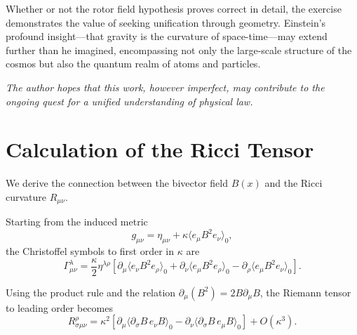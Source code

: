 \documentclass[11pt,a4paper]{article}
\numberwithin{equation}{section}
\theoremstyle{plain}
\theoremstyle{definition}
\theoremstyle{remark}
\newif\ifack
\begin{document}
Whether or not the rotor field hypothesis proves correct in detail, the exercise demonstrates the value of seeking unification through geometry. Einstein's profound insight---that gravity is the curvature of space-time---may extend further than he imagined, encompassing not only the large-scale structure of the cosmos but also the quantum realm of atoms and particles.

\medskip
\noindent\textit{The author hopes that this work, however imperfect, may contribute to the ongoing quest for a unified understanding of physical law.}

\ifack
\section*{Acknowledgements}
The author is indebted to the pioneering work of David Hestenes and colleagues in developing geometric algebra as a language for physics. Discussions with Anthony Lasenby and Chris Doran on gauge theory gravity were invaluable. Thanks are due to the LIGO and Virgo collaborations for making gravitational wave data publicly available. This work was conducted independently without external funding.
\fi

\appendix
\section{Calculation of the Ricci Tensor}
\label{app:ricci}

We derive the connection between the bivector field $B(x)$ and the Ricci curvature $R_{\mu\nu}$.

Starting from the induced metric
\begin{equation}
g_{\mu\nu} = \eta_{\mu\nu} + \kappa \langle e_\mu B^2 e_\nu \rangle_0,
\end{equation}
the Christoffel symbols to first order in $\kappa$ are
\begin{equation}
\Gamma^\lambda_{\mu\nu} = \frac{\kappa}{2} \eta^{\lambda\rho} \left[\partial_\mu \langle e_\nu B^2 e_\rho \rangle_0 + \partial_\nu \langle e_\mu B^2 e_\rho \rangle_0 - \partial_\rho \langle e_\mu B^2 e_\nu \rangle_0\right].
\end{equation}

Using the product rule and the relation $\partial_\mu (B^2) = 2 B \partial_\mu B$, the Riemann tensor to leading order becomes
\begin{equation}
R^\rho_{\sigma\mu\nu} = \kappa^2 \left[\partial_\mu \langle \partial_\sigma B \, e_\nu B \rangle_0 - \partial_\nu \langle \partial_\sigma B \, e_\mu B \rangle_0\right] + O(\kappa^3).
\end{equation}
\end{document}
